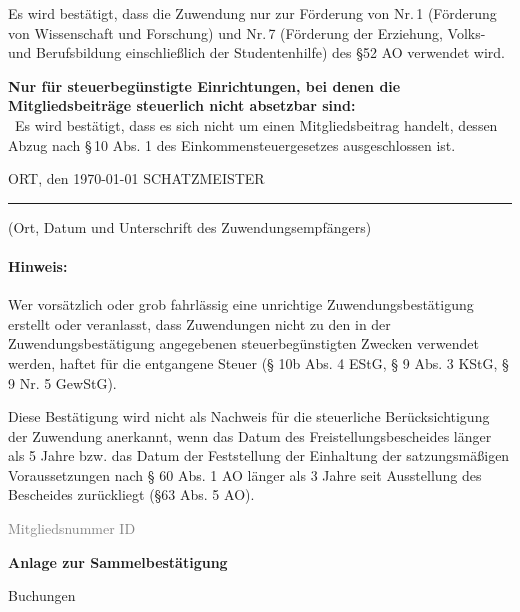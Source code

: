 \documentclass[11pt,ngerman]{scrartcl}
\newcommand{\VAR}[1]{#1}
\newcommand{\unmychecked}{\scalebox{1.5}{\Square}}
\begin{document}
\begin{mdframed}[style=MyFormStyle]%
\footnotesize Es wird bestätigt, dass die Zuwendung nur zur Förderung von Nr.\,1 (Förderung von Wissenschaft und Forschung) und  Nr.\,7 (Förderung der Erziehung, Volks- und Berufsbildung einschließlich der Studentenhilfe) des §52 AO verwendet wird. \vspace{0.5em}

\textbf{Nur für steuerbegünstigte Einrichtungen, bei denen die Mitgliedsbeiträge steuerlich nicht absetzbar sind:} \\
\unmychecked\, Es wird bestätigt, dass es sich nicht um einen Mitgliedsbeitrag handelt, dessen Abzug nach §\,10 Abs. 1 des Einkommensteuergesetzes ausgeschlossen ist. 

\end{mdframed} 


\vspace*{2.5em} 

ORT, den \today \hspace*{20em} SCHATZMEISTER

\hrule

\vspace*{0.5em} (Ort, Datum und Unterschrift des Zuwendungsempfängers) 

\paragraph{Hinweis:} Wer vorsätzlich oder grob fahrlässig eine unrichtige Zuwendungsbestätigung erstellt oder veranlasst, dass 
Zuwendungen nicht zu den in der Zuwendungsbestätigung angegebenen steuerbegünstigten Zwecken verwendet 
werden, haftet für die entgangene Steuer (§ 10b Abs. 4 EStG, § 9 Abs. 3 KStG, § 9 Nr. 5 GewStG). 

Diese Bestätigung wird nicht als Nachweis für die steuerliche Berücksichtigung der Zuwendung anerkannt, wenn das Datum des Freistellungsbescheides länger als 5 Jahre bzw. das Datum der Feststellung der Einhaltung der satzungsmäßigen Voraussetzungen nach § 60 Abs. 1 AO länger als 3 Jahre seit Ausstellung des Bescheides zurückliegt (§63 Abs. 5 AO). 

\vfill \footnotesize{\textcolor{gray}{Mitgliedsnummer \VAR{ID}}}

\clearpage

{\bfseries\large Anlage zur Sammelbestätigung} \vspace*{2em}


\VAR{Buchungen}
\end{document}

